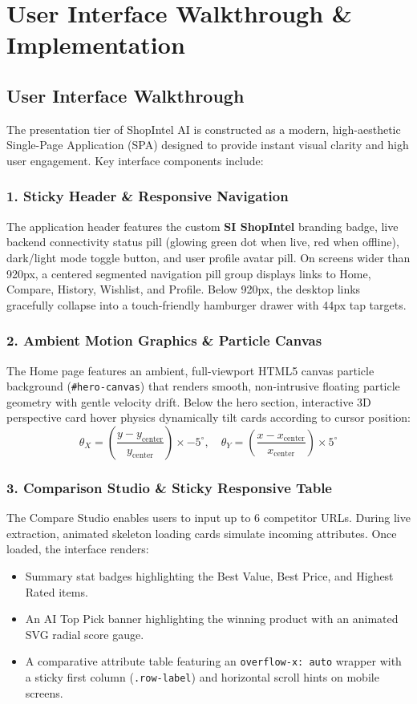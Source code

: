 \documentclass[12pt,a4paper,oneside]{report}
\begin{document}
\chapter{User Interface Walkthrough \& Implementation}

\section{User Interface Walkthrough}
The presentation tier of ShopIntel AI is constructed as a modern, high-aesthetic Single-Page Application (SPA) designed to provide instant visual clarity and high user engagement. Key interface components include:

\subsection{1. Sticky Header \& Responsive Navigation}
The application header features the custom \textbf{SI ShopIntel} branding badge, live backend connectivity status pill (glowing green dot when live, red when offline), dark/light mode toggle button, and user profile avatar pill. On screens wider than 920px, a centered segmented navigation pill group displays links to Home, Compare, History, Wishlist, and Profile. Below 920px, the desktop links gracefully collapse into a touch-friendly hamburger drawer with 44px tap targets.

\subsection{2. Ambient Motion Graphics \& Particle Canvas}
The Home page features an ambient, full-viewport HTML5 canvas particle background (\texttt{\#hero-canvas}) that renders smooth, non-intrusive floating particle geometry with gentle velocity drift. Below the hero section, interactive 3D perspective card hover physics dynamically tilt cards according to cursor position:
\begin{equation}
\theta_X = \left(\frac{y - y_{\text{center}}}{y_{\text{center}}}\right) \times -5^\circ, \quad \theta_Y = \left(\frac{x - x_{\text{center}}}{x_{\text{center}}}\right) \times 5^\circ
\end{equation}

\subsection{3. Comparison Studio \& Sticky Responsive Table}
The Compare Studio enables users to input up to 6 competitor URLs. During live extraction, animated skeleton loading cards simulate incoming attributes. Once loaded, the interface renders:
\begin{itemize}
    \item Summary stat badges highlighting the Best Value, Best Price, and Highest Rated items.
    \item An AI Top Pick banner highlighting the winning product with an animated SVG radial score gauge.
    \item A comparative attribute table featuring an \texttt{overflow-x: auto} wrapper with a sticky first column (\texttt{.row-label}) and horizontal scroll hints on mobile screens.
\end{itemize}
\end{document}
